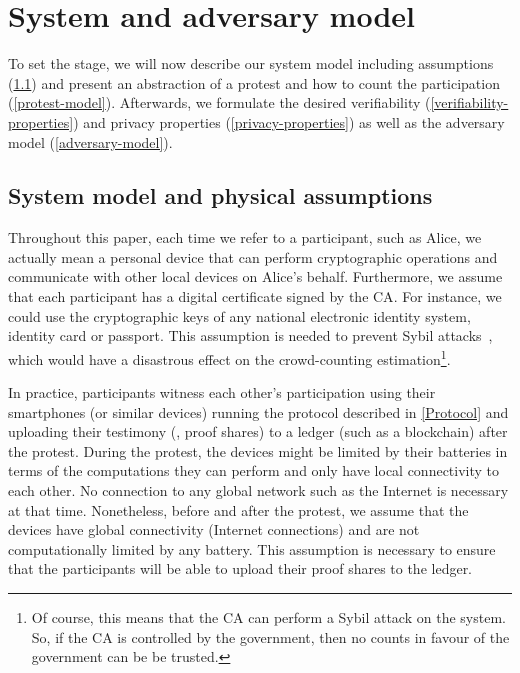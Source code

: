 \section{System and adversary model}%
\label{system-model}

To set the stage, we will now describe our system model including assumptions (\cref{assumptions}) and present an abstraction of a protest and how to
count the participation (\cref{protest-model}). 
Afterwards, we formulate the desired verifiability (\cref{verifiability-properties}) and privacy properties
(\cref{privacy-properties}) as well as the adversary model (\cref{adversary-model}).

\subsection{System model and physical assumptions}
\label{assumptions}

Throughout this paper, each time we refer to a participant, such as Alice, we actually mean a personal device that can perform cryptographic operations and communicate with other local devices on Alice's behalf. 
Furthermore, we assume that each participant has a digital certificate signed by the \ac{CA}.
For instance, we could use the cryptographic keys of any national electronic identity system, identity card or passport.
This assumption is needed to prevent Sybil attacks~\cite{SybilAttack}, which 
would have a disastrous effect on the crowd-counting estimation\footnote{%
  Of course, this means that the \ac{CA} can perform a Sybil attack on the 
  system.
  So, if the \ac{CA} is controlled by the government, then no counts in favour 
  of the government can be be trusted.
}.

In practice, participants witness each other's participation using their smartphones (or similar devices) running the protocol described in \cref{Protocol} and uploading their testimony (\ie, proof shares) to a ledger (such as a blockchain) after the protest. 
During the protest, the devices might be limited by their batteries in terms of the computations they can perform and only have local connectivity to each other.
No connection to any global network such as the Internet is necessary at that time.  
Nonetheless, before and after the protest, we assume that the devices have global connectivity (\ie Internet connections) and are not computationally limited by any battery.
This assumption is necessary to ensure that the participants will be able to upload their proof shares to the ledger.

